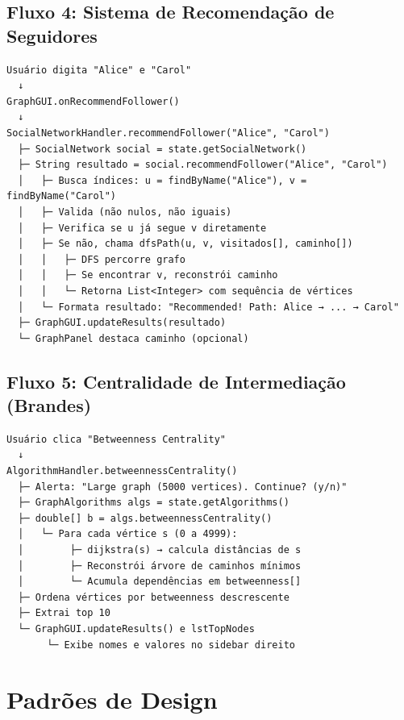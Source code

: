 \documentclass[12pt,a4paper]{article}
\begin{document}
\subsection{Fluxo 4: Sistema de Recomendação de Seguidores}

\begin{verbatim}
Usuário digita "Alice" e "Carol"
  ↓
GraphGUI.onRecommendFollower()
  ↓
SocialNetworkHandler.recommendFollower("Alice", "Carol")
  ├─ SocialNetwork social = state.getSocialNetwork()
  ├─ String resultado = social.recommendFollower("Alice", "Carol")
  │   ├─ Busca índices: u = findByName("Alice"), v = findByName("Carol")
  │   ├─ Valida (não nulos, não iguais)
  │   ├─ Verifica se u já segue v diretamente
  │   ├─ Se não, chama dfsPath(u, v, visitados[], caminho[])
  │   │   ├─ DFS percorre grafo
  │   │   ├─ Se encontrar v, reconstrói caminho
  │   │   └─ Retorna List<Integer> com sequência de vértices
  │   └─ Formata resultado: "Recommended! Path: Alice → ... → Carol"
  ├─ GraphGUI.updateResults(resultado)
  └─ GraphPanel destaca caminho (opcional)
\end{verbatim}

\subsection{Fluxo 5: Centralidade de Intermediação (Brandes)}

\begin{verbatim}
Usuário clica "Betweenness Centrality"
  ↓
AlgorithmHandler.betweennessCentrality()
  ├─ Alerta: "Large graph (5000 vertices). Continue? (y/n)"
  ├─ GraphAlgorithms algs = state.getAlgorithms()
  ├─ double[] b = algs.betweennessCentrality()
  │   └─ Para cada vértice s (0 a 4999):
  │        ├─ dijkstra(s) → calcula distâncias de s
  │        ├─ Reconstrói árvore de caminhos mínimos
  │        └─ Acumula dependências em betweenness[]
  ├─ Ordena vértices por betweenness descrescente
  ├─ Extrai top 10
  └─ GraphGUI.updateResults() e lstTopNodes
       └─ Exibe nomes e valores no sidebar direito
\end{verbatim}

\newpage

\section{Padrões de Design}
\end{document}
